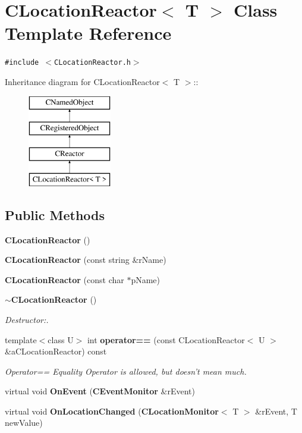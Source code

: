 \section{CLocation\-Reactor$<$ T $>$  Class Template Reference}
\label{classCLocationReactor}
{\tt \#include $<$CLocation\-Reactor.h$>$}

Inheritance diagram for CLocation\-Reactor$<$ T $>$::\begin{figure}[H]
\begin{center}
\leavevmode
\includegraphics[height=4cm]{classCLocationReactor}
\end{center}
\end{figure}
\subsection*{Public Methods}
\begin{CompactItemize}
\item 
{\bf CLocation\-Reactor} ()
\item 
{\bf CLocation\-Reactor} (const string \&r\-Name)
\item 
{\bf CLocation\-Reactor} (const char $\ast$p\-Name)
\item 
{\bf $\sim$CLocation\-Reactor} ()
\begin{CompactList}\small\item\em Destructor:.\item\end{CompactList}\item 
template$<$class U$>$ int {\bf operator==} (const CLocation\-Reactor$<$ U $>$ \&a\-CLocation\-Reactor) const
\begin{CompactList}\small\item\em Operator== Equality Operator is allowed, but doesn't mean much.\item\end{CompactList}\item 
virtual void {\bf On\-Event} ({\bf CEvent\-Monitor} \&r\-Event)
\item 
virtual void {\bf On\-Location\-Changed} ({\bf CLocation\-Monitor}$<$ T $>$ \&r\-Event, T new\-Value)
\end{CompactItemize}
